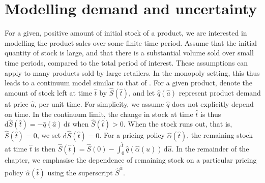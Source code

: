\documentclass[main.tex]{subfiles}
\begin{document}
\section{Modelling demand and uncertainty}\label{sec:cts_modelling}
For a given, positive amount of initial stock of a product, we are interested in
modelling the product sales over some finite time period.
Assume that the initial quantity of stock is large, and that there is a
substantial volume sold over small time periods, compared to the total
period of interest. These assumptions can apply to many products sold
by large retailers. In the monopoly setting, this thus leads to
a continuum model similar to that of \citet{kalish1983monopolist}.
For a given product, denote the amount of stock left at time $\hat{t}$ by $\hat{S}(\hat{t})$,
and let $\hat{q}(\hat{a})$ represent product demand at price $\hat{a}$, per unit
time.
For simplicity, we assume $\hat{q}$ does not explicitly depend on time.
In the continuum limit, the change in  stock at time $\hat{t}$
is thus $\mathrm{d}\hat{S}(\hat{t})=-\hat{q}(\hat{a})\,\mathrm{d}t$
when $\hat{S}(\hat{t})>0$. When the
stock runs out, that is, $\hat{S}(\hat{t})=0$, we set $\mathrm{d}\hat{S}(\hat{t})=0$.
For a pricing policy
$\hat{\alpha}(\hat{t})$, the remaining stock at time $\hat{t}$ is then
$\hat{S}(\hat{t})=\hat{S}(0)-\int_0^{\hat{t}}\hat{q}(\hat{\alpha}(\hat{u}))\,\mathrm{d}\hat{u}$. In
the remainder of the chapter,
we emphasise the dependence of remaining stock on a particular
pricing policy $\hat{\alpha}(\hat{t})$ using the superscript $\hat{S}^{\hat{\alpha}}$.
\end{document}
